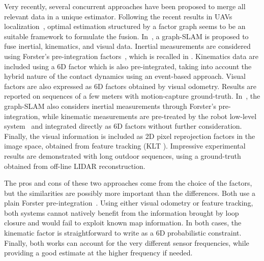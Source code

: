 Very recently, several concurrent approaches have been proposed to merge all relevant data in a unique estimator.
Following the recent results in UAVs localization~\cite{forster2017-TRO,leutenegger2015keyframe}, optimal estimation 
structured by a factor graph seems to be an suitable framework to formulate the fusion.
In~\cite{hartley2018legged}, a graph-SLAM is proposed to fuse inertial, kinematics, and visual data.
Inertial measurements are considered using Forster's pre-integration factors~\cite{forster2017-TRO}, which is recalled in .
Kinematics data are included using a 6D factor which is also pre-integrated, taking into account the hybrid nature 
of the contact dynamics using an event-based approach.
Visual factors are also expressed as 6D factors obtained by visual odometry. Results are reported on sequences of a few meters with motion-capture ground-truth.
In~\cite{wisth2019robust}, the graph-SLAM also considers inertial measurements through Forster's pre-integration, while kinematic
 measurements are pre-treated by the robot low-level system~\cite{bloesch2017two} and integrated directly as 6D factors without further consideration.
Finally, the visual information is included as 2D pixel reprojection factors in the image space, obtained from feature tracking (KLT \cite{baker2004lucas}).
Impressive experimental results are demonstrated with long outdoor sequences, using a ground-truth obtained from off-line LIDAR reconstruction.

The pros and cons of these two approaches come from the choice of the factors, but the similarities are possibly more important than the differences.
Both use a plain Forster pre-integration~\cite{forster2017-TRO}. 
Using either visual odometry or feature tracking, both systems cannot natively benefit from the information brought by loop closure and would fail 
to exploit known map information.
In both cases, the kinematic factor is straightforward to write as a 6D probabilistic constraint.
Finally, both works can account for the very different sensor frequencies, while providing a good estimate at the higher frequency if needed.



